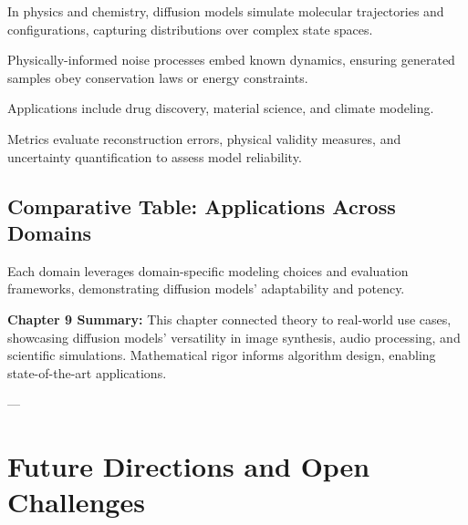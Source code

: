 \documentclass[a4paper,12pt,oneside]{memoir}
\begin{document}
In physics and chemistry, diffusion models simulate molecular trajectories and configurations, capturing distributions over complex state spaces.

Physically-informed noise processes embed known dynamics, ensuring generated samples obey conservation laws or energy constraints.

Applications include drug discovery, material science, and climate modeling.

Metrics evaluate reconstruction errors, physical validity measures, and uncertainty quantification to assess model reliability.

\section{Comparative Table: Applications Across Domains}

\begin{table}[h]
\centering
{}
\caption{Cross-Domain Diffusion Model Applications}
\end{table}

Each domain leverages domain-specific modeling choices and evaluation frameworks, demonstrating diffusion models’ adaptability and potency.

\textbf{Chapter 9 Summary:}  
This chapter connected theory to real-world use cases, showcasing diffusion models’ versatility in image synthesis, audio processing, and scientific simulations. Mathematical rigor informs algorithm design, enabling state-of-the-art applications.

---

\chapter{Future Directions and Open Challenges}
\end{document}
